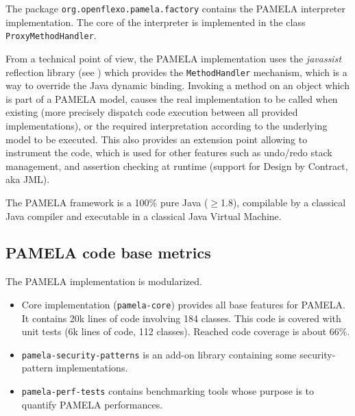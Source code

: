 The package \texttt{org.openflexo.pamela.factory} contains the PAMELA interpreter implementation. The core of the interpreter is implemented in the class \texttt{ProxyMethodHandler}.

From a technical point of view, the PAMELA implementation uses the \emph{javassist} reflection library (see \cite{shigueru2000}) which provides the \texttt{MethodHandler} mechanism, which is a way to override the Java dynamic binding. Invoking a method on an object which is part of a PAMELA model, causes the real implementation to be called when existing (more precisely dispatch code execution between all provided implementations), or the required interpretation according to the underlying model to be executed. This also provides an extension point allowing to instrument the code, which is used for other features such as undo/redo stack management, and assertion checking at runtime (support for Design by Contract, aka JML).

The PAMELA framework is a 100\% pure Java ($\geq$1.8), compilable by a classical Java compiler and executable in a classical Java Virtual Machine.

\subsection{PAMELA code base metrics}

The PAMELA implementation is modularized. 

\begin{itemize}
    \vspace{-0.2cm}\item Core implementation (\texttt{pamela-core}) provides all base features for PAMELA. It contains 20k lines of code involving 184 classes. This code is covered with unit tests (6k lines of code, 112 classes). Reached code coverage is about 66\%.
    \vspace{-0.2cm}\item \texttt{pamela-security-patterns} is an add-on library containing some security-pattern implementations.
    \vspace{-0.2cm}\item \texttt{pamela-perf-tests} contains benchmarking tools whose purpose is to quantify PAMELA performances. 
\end{itemize}


